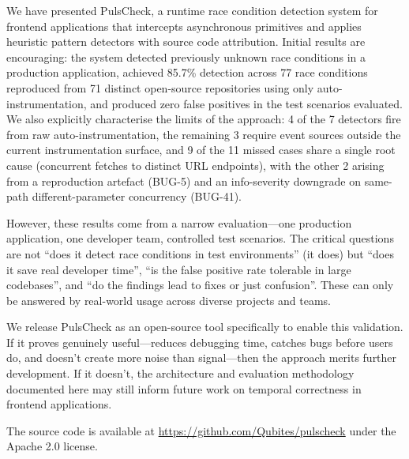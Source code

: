 \documentclass[11pt,a4paper]{article}
\begin{document}
We have presented PulsCheck, a runtime race condition detection system for frontend applications that intercepts asynchronous primitives and applies heuristic pattern detectors with source code attribution. Initial results are encouraging: the system detected previously unknown race conditions in a production application, achieved 85.7\% detection across 77 race conditions reproduced from 71 distinct open-source repositories using only auto-instrumentation, and produced zero false positives in the test scenarios evaluated. We also explicitly characterise the limits of the approach: 4 of the 7 detectors fire from raw auto-instrumentation, the remaining 3 require event sources outside the current instrumentation surface, and 9 of the 11 missed cases share a single root cause (concurrent fetches to distinct URL endpoints), with the other 2 arising from a reproduction artefact (BUG-5) and an info-severity downgrade on same-path different-parameter concurrency (BUG-41).

However, these results come from a narrow evaluation---one production application, one developer team, controlled test scenarios. The critical questions are not ``does it detect race conditions in test environments'' (it does) but ``does it save real developer time'', ``is the false positive rate tolerable in large codebases'', and ``do the findings lead to fixes or just confusion''. These can only be answered by real-world usage across diverse projects and teams.

We release PulsCheck as an open-source tool specifically to enable this validation. If it proves genuinely useful---reduces debugging time, catches bugs before users do, and doesn't create more noise than signal---then the approach merits further development. If it doesn't, the architecture and evaluation methodology documented here may still inform future work on temporal correctness in frontend applications.

The source code is available at \url{https://github.com/Qubites/pulscheck} under the Apache 2.0 license.



\end{document}
